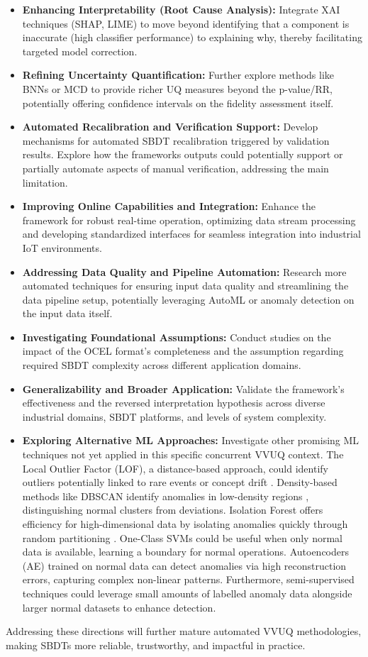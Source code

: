 \begin{itemize}
  \item \textbf{Enhancing Interpretability (Root Cause Analysis):} Integrate XAI techniques (SHAP, LIME) to move beyond identifying that a component is inaccurate (high classifier performance) to explaining why, thereby facilitating targeted model correction.
  \item \textbf{Refining Uncertainty Quantification:} Further explore methods like BNNs or MCD to provide richer UQ measures beyond the p-value/RR, potentially offering confidence intervals on the fidelity assessment itself.
  \item \textbf{Automated Recalibration and Verification Support:} Develop mechanisms for automated SBDT recalibration triggered by validation results. Explore how the frameworks outputs could potentially support or partially automate aspects of manual verification, addressing the main limitation.
  \item \textbf{Improving Online Capabilities and Integration:} Enhance the framework for robust real-time operation, optimizing data stream processing and developing standardized interfaces for seamless integration into industrial IoT environments.
  \item \textbf{Addressing Data Quality and Pipeline Automation:} Research more automated techniques for ensuring input data quality and streamlining the data pipeline setup, potentially leveraging AutoML or anomaly detection on the input data itself.
  \item \textbf{Investigating Foundational Assumptions:} Conduct studies on the impact of the OCEL format's completeness and the assumption regarding required SBDT complexity across different application domains.
  \item \textbf{Generalizability and Broader Application:} Validate the framework's effectiveness and the reversed interpretation hypothesis across diverse industrial domains, SBDT platforms, and levels of system complexity.
  \item \textbf{Exploring Alternative ML Approaches:} Investigate other promising ML techniques not yet applied in this specific concurrent VVUQ context. The Local Outlier Factor (LOF), a distance-based approach, could identify outliers potentially linked to rare events or concept drift \autocite{alghushairy2020review}. Density-based methods like DBSCAN identify anomalies in low-density regions \autocite{ccelik2011anomaly}, distinguishing normal clusters from deviations. Isolation Forest offers efficiency for high-dimensional data by isolating anomalies quickly through random partitioning \autocite{xu2017improved}. One-Class SVMs \autocite{li2003improving} could be useful when only normal data is available, learning a boundary for normal operations. Autoencoders (AE) \autocite{zhou2017anomaly} trained on normal data can detect anomalies via high reconstruction errors, capturing complex non-linear patterns. Furthermore, semi-supervised techniques could leverage small amounts of labelled anomaly data alongside larger normal datasets to enhance detection.
\end{itemize}

Addressing these directions will further mature automated VVUQ methodologies, making SBDTs more reliable, trustworthy, and impactful in practice. \blacksquare